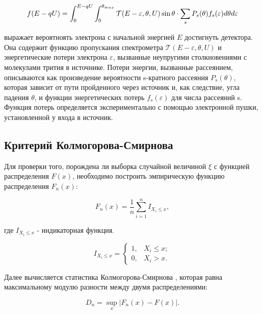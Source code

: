 \documentclass[a4paper,14pt]{extarticle}
\begin{document}
    \begin{equation}
      f(E-qU) = \int_0^{E-qU} \int_0^{\theta_{max}} \mathcal T(E - \varepsilon, \theta, U) \sin\theta \\
      \cdot \displaystyle\sum_s P_s(\theta)f_s(\varepsilon) d\theta d\varepsilon
    \end{equation}
    
    \noindent выражает вероятноять электрона с начальной энергией $E$ достигнуть детектора. Она содержит функцию 
    пропускания спектрометра $\mathcal T(E - \varepsilon, \theta, U)$ и энергетические потери электрона
    $\varepsilon$, вызванные неупругими столкновениями с молекулами трития в источнике. Потери энергии, вызванные
    рассеянием, описываются как произведение вероятности s-кратного рассеяния $P_s(\theta)$, которая зависит от пути 
    пройденного через источник и, как следствие, угла падения $\theta$, и функции энергетических потерь 
    $f_s(\varepsilon)$ для числа рассеяний s. Функция потерь определяется экспериментально с помощью электронной
    пушки, установленной у входа в источник.
    
    
    
    
    \subsection{Критерий Колмогорова-Смирнова}
    Для проверки того, порождена ли выборка случайной величиной $\xi$ с функцией распределения $F(x)$, необходимо 
    построить эмпирическую функцию распределения $F_n(x)$:
    
    \begin{equation}
      F_n(x) = \frac{1}{n} \sum_{i=1}^n I_{X_i \leq x},
    \end{equation}
    
    \noindent где $I_{X_i \leq x}$ - индикаторная функция.
    
    \begin{equation}
      I_{X_i \leq x} = 
      \begin{cases}
        1, & X_i \leq x; \\
        0, & X_i > x.
      \end{cases}
    \end{equation}
    
    Далее вычисляется статистика Колмогорова-Смирнова \cite{kolmogorov} \cite{frank_j}, которая равна 
    максимальному модулю разности между двумя распределениями:
    
    \begin{equation}
      D_n = \sup_x |F_n(x) - F(x)|.
    \end{equation}
    
\end{document}
